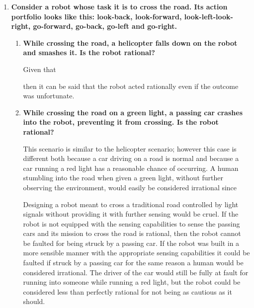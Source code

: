 \begin{enumerate}
\item \textbf{Consider a robot whose task it is to cross the road. Its action portfolio looks like this: look-back, look-forward, look-left-look-right, go-forward, go-back, go-left and go-right.}

\begin{enumerate}

\item \textbf{While crossing the road, a helicopter falls down on the robot and smashes it. Is the robot rational?}

Given that
then it can be said that the robot acted rationally even if the outcome was unfortunate.

\item \textbf{While crossing the road on a green light, a passing car crashes into the robot, preventing it from crossing. Is the robot rational?}

This scenario is similar to the helicopter scenario; however this case is different both because a car driving on a road is normal and because a car running a red light has a reasonable chance of occurring. A human stumbling into the road when given a green light, without further observing the environment, would easily be considered irrational since

Designing a robot meant to cross a traditional road controlled by light signals without providing it with further sensing would be cruel. If the robot is not equipped with the sensing capabilities to sense the passing cars and its mission to cross the road is rational, then the robot cannot be faulted for being struck by a passing car. If the robot was built in a more sensible manner with the appropriate sensing capabilities it could be faulted if struck by a passing car for the same reason a human would be considered irrational. The driver of the car would still be fully at fault for running into someone while running a red light, but the robot could be considered less than perfectly rational for not being as cautious as it should.


\end{enumerate}
\end{enumerate}
